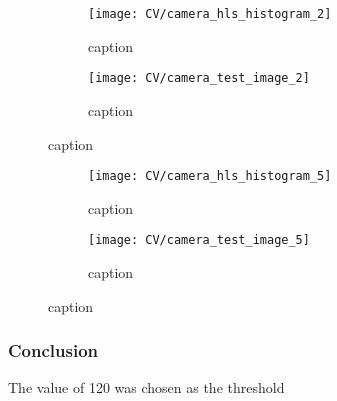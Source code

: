 \documentclass[../Head/Main.tex]{subfiles}
\begin{document}
\begin{figure}[H]
	\centering
	\begin{subfigure}[b]{0.48\textwidth}
		\centering
		\texttt{[image: CV/camera\_hls\_histogram\_2]}
		\caption{caption}
	\end{subfigure}
	\hfill
	\begin{subfigure}[b]{0.5\textwidth}
		\centering
		\texttt{[image: CV/camera\_test\_image\_2]}
		\caption{caption}
	\end{subfigure}
	\caption{caption}
\end{figure}

\begin{figure}[H]
	\centering
	\begin{subfigure}[b]{0.48\textwidth}
		\centering
		\texttt{[image: CV/camera\_hls\_histogram\_5]}
		\caption{caption}
	\end{subfigure}
	\hfill
	\begin{subfigure}[b]{0.5\textwidth}
		\centering
		\texttt{[image: CV/camera\_test\_image\_5]}
		\caption{caption}
	\end{subfigure}
	\caption{caption}
\end{figure}

\subsubsection*{Conclusion}
The value of 120 was chosen as the threshold 
\end{document}
